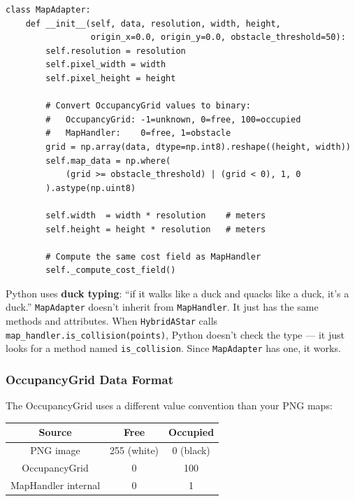 \documentclass[12pt, a4paper]{article}
\begin{document}
\begin{lstlisting}[style=python, caption={MapAdapter constructor (map\_adapter.py, simplified)}]
class MapAdapter:
    def __init__(self, data, resolution, width, height,
                 origin_x=0.0, origin_y=0.0, obstacle_threshold=50):
        self.resolution = resolution
        self.pixel_width = width
        self.pixel_height = height

        # Convert OccupancyGrid values to binary:
        #   OccupancyGrid: -1=unknown, 0=free, 100=occupied
        #   MapHandler:    0=free, 1=obstacle
        grid = np.array(data, dtype=np.int8).reshape((height, width))
        self.map_data = np.where(
            (grid >= obstacle_threshold) | (grid < 0), 1, 0
        ).astype(np.uint8)

        self.width  = width * resolution    # meters
        self.height = height * resolution   # meters

        # Compute the same cost field as MapHandler
        self._compute_cost_field()
\end{lstlisting}

\begin{keybox}
Python uses \textbf{duck typing}: ``if it walks like a duck and quacks
like a duck, it's a duck.'' \texttt{MapAdapter} doesn't inherit from
\texttt{MapHandler}. It just has the same methods and attributes.
When \texttt{HybridAStar} calls \texttt{map\_handler.is\_collision(points)},
Python doesn't check the type --- it just looks for a method named
\texttt{is\_collision}. Since \texttt{MapAdapter} has one, it works.
\end{keybox}

\subsubsection{OccupancyGrid Data Format}

The OccupancyGrid uses a different value convention than your PNG maps:

\begin{center}
\begin{tabular}{ccc}
    \toprule
    \textbf{Source} & \textbf{Free} & \textbf{Occupied} \\
    \midrule
    PNG image & 255 (white) & 0 (black) \\
    OccupancyGrid & 0 & 100 \\
    MapHandler internal & 0 & 1 \\
    \bottomrule
\end{tabular}
\end{center}
\end{document}
